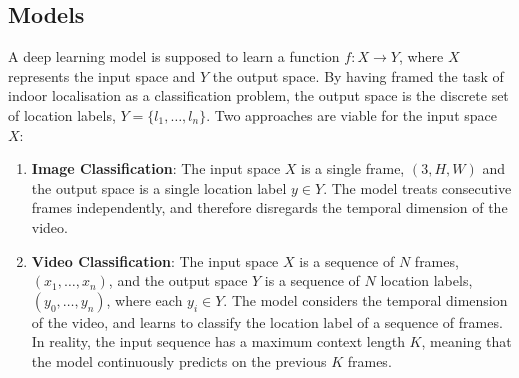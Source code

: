 \documentclass{article}
\begin{document}
  

  \subsection{Models} %
  \label{sub:models}

  A deep learning model is supposed to learn a function $f: X \rightarrow Y$,
  where $X$ represents the input space and $Y$ the output space. By having
  framed the task of indoor localisation as a classification problem, the output
  space is the discrete set of location labels, $Y = \{l_1, \ldots, l_n\}$.
  Two approaches are viable for the input space $X$:

  \begin{enumerate}

    \item \textbf{Image Classification}: The input space $X$ is a single frame,
      $(3, H, W)$ and the output space is a single location label $y \in Y$.
      The model treats consecutive frames independently, and
      therefore disregards the temporal dimension of the video.

    \item \textbf{Video Classification}: The input space $X$ is a sequence of
      $N$ frames, $(x_1, \ldots, x_n)$, and the output space $Y$ is a sequence
      of $N$ location labels, $(y_0, \ldots, y_n)$, where each $y_i \in Y$. The
      model considers the temporal dimension of the video, and learns to
      classify the location label of a sequence of frames. In reality, the input
      sequence has a maximum context length $K$, meaning that the model
      continuously predicts on the previous $K$ frames.

  \end{enumerate}


\end{document}
